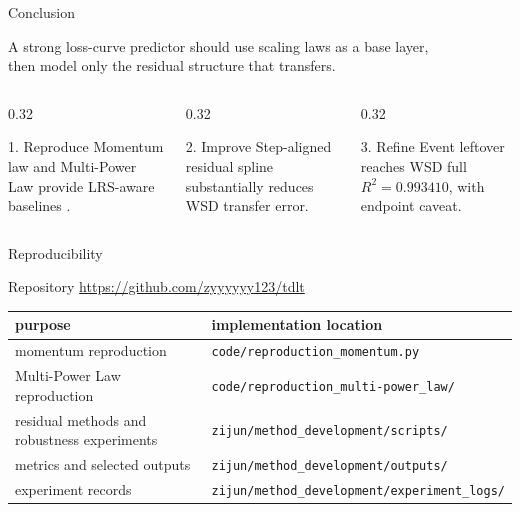 \documentclass[fontset=fandol,aspectratio=169,10pt]{ctexbeamer}
\newcommand{\RepoURL}{\url{https://github.com/zyyyyyy123/tdlt}}
\begin{document}
\begin{frame}{Conclusion}
  \begin{center}
    \Large
    A strong loss-curve predictor should use scaling laws as a base layer,\\
    then model only the residual structure that transfers.
  \end{center}
  \vspace{0.9em}
  \begin{columns}[T,onlytextwidth]
    \begin{column}{0.32\textwidth}
      \begin{block}{1. Reproduce}
        Momentum law and Multi-Power Law provide LRS-aware baselines
        \cite{luo2025multi,tissue2026scaling}.
      \end{block}
    \end{column}
    \begin{column}{0.32\textwidth}
      \begin{block}{2. Improve}
        Step-aligned residual spline substantially reduces WSD transfer error.
      \end{block}
    \end{column}
    \begin{column}{0.32\textwidth}
      \begin{block}{3. Refine}
        Event leftover reaches WSD full \(R^2=0.993410\), with endpoint caveat.
      \end{block}
    \end{column}
  \end{columns}
\end{frame}

\begin{frame}{Reproducibility}
  \begin{block}{Repository}
    \RepoURL
  \end{block}
  \begin{table}
    \centering
    \scriptsize
    \begin{tabularx}{0.98\textwidth}{l>{\raggedright\arraybackslash}X}
      \toprule
      purpose & implementation location\\
      \midrule
      momentum reproduction & \texttt{code/reproduction\_momentum.py}\\
      Multi-Power Law reproduction & \texttt{code/reproduction\_multi-power\_law/}\\
      residual methods and robustness experiments & \texttt{zijun/method\_development/scripts/}\\
      metrics and selected outputs & \texttt{zijun/method\_development/outputs/}\\
      experiment records & \texttt{zijun/method\_development/experiment\_logs/}\\
      \bottomrule
    \end{tabularx}
  \end{table}
\end{frame}
\end{document}
